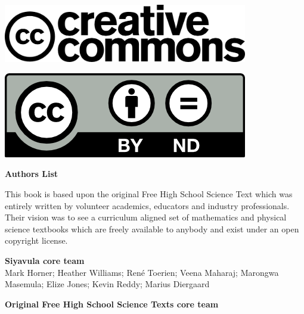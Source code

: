 \vspace*{4in}

\begin{center}
\begin{minipage}{0.6\textwidth}
\includegraphics[width=0.8\textwidth]{title_images/cc2.png}
\end{minipage}
\begin{minipage}{0.3\textwidth}
\includegraphics[width=0.8\textwidth]{title_images/cc1.png}
\end{minipage}
\end{center}







\newpage
\thispagestyle{empty}


\begin{flushleft} \textbf{\huge Authors List} \end{flushleft}

{\LARGE This book is based upon the original Free High School Science Text which was entirely written by
volunteer academics, educators and industry professionals. Their vision was to see a curriculum aligned
set of mathematics and physical science textbooks which are freely available to anybody and exist
under an open copyright license.} \par

\textbf{\LARGE Siyavula core team} \\

Mark Horner; Heather Williams; René Toerien; Veena Maharaj; Marongwa Masemula; Elize Jones; Kevin Reddy; Marius Diergaard \par

\textbf{\LARGE Original Free High School Science Texts core team}\\

